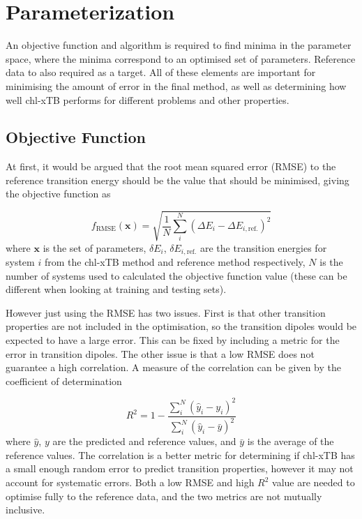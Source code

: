 \afterpartskip
\section{Parameterization}
\label{sec:chl_params}
An objective function and algorithm is required to find minima in the parameter 
space, where the minima correspond to an optimised set of parameters. Reference data
to also required as a target. All of these elements are important for minimising
the amount of error in the final method, as well as determining how well chl-xTB
performs for different problems and other properties.

\subsection{Objective Function}
\label{subsec:obj_func}
At first, it would be argued that the root mean squared error (RMSE) to the reference 
transition energy should be the value that should be minimised, giving the objective
function as

\begin{equation}
f_{\text{RMSE}}\left(\mathbf{x}\right) = \sqrt{ \frac{1}{N} \sum^N_i \left( \Delta E_i  - \Delta E_{i, \text{ref.}}\right)^2}
\end{equation}
%
where $\textbf{x}$ is the set of parameters, $\delta E_i$, $\delta E_{i,\text{ref.}}$ 
are the transition energies for system $i$ from the chl-xTB method and reference
method respectively, $N$ is the number of systems used to calculated the objective
function value (these can be different when looking at training and testing sets).

However just using the RMSE has two issues. First is that other transition properties are not 
included in the optimisation, so the transition dipoles would be expected to have 
a large error. This can be fixed by including a metric for the error in transition dipoles.
The other issue is that a low RMSE does not guarantee a high correlation. A measure
of the correlation can be given by the coefficient of determination

\begin{equation}
R^2 = 1 - \frac{\sum^N_i \left(\hat{y}_i - y_i \right)^2}{\sum^N_i \left(\hat{y}_i - \bar{y}\right)^2}
\end{equation}
%
where $\hat{y}$, $y$ are the predicted and reference values, and $\bar{y}$ is the
average of the reference values. The correlation is a better metric for determining
if chl-xTB has a small enough random error to predict transition properties, however
it may not account for systematic errors. Both a low RMSE and high $R^2$ value are
needed to optimise fully to the reference data, and the two metrics are not mutually
inclusive.

